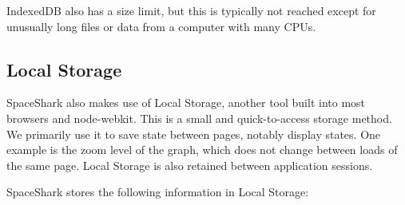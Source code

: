 \documentclass{hmcclinic}
\begin{document}

  IndexedDB also has  a size limit, but this is typically not reached except for
  unusually long files or data from a computer with many CPUs. 

  \subsection{Local Storage}

  SpaceShark also makes use of Local Storage, another tool
  built into most browsers and node-webkit. This is a small and quick-to-access
  storage method. We primarily use it to save state between pages, notably
  display states. One example is the zoom level of the graph, which does not
  change between loads of the same page. Local Storage is also retained between
  application sessions.

  SpaceShark stores the following information in Local Storage:
\end{document}
